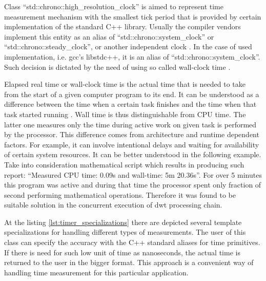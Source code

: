 Class ``std::chrono::high\_resolution\_clock'' is aimed to represent time measurement mechanism with the
smallest tick period that is provided by certain implementation of the standard C++ library. Usually
the compiler vendors implement this entity as an alias of ``std::chrono::system\_clock'' or
``std::chrono::steady\_clock'', or another independent clock \cite{cppreference}. In the case of used implementation,
i.e. gcc's libstdc++, it is an alias of ``std::chrono::system\_clock''. Such decision is dictated by
the need of using so called wall-clock time \cite{cppreference}.

Elapsed real time or wall-clock time is the actual time that is needed to take from the start of a given
computer program to its end. It can be understood as a difference between the time when a certain task 
finishes and the time when that task started running \cite{wall_clock}. Wall time is thus distinguishable
from CPU time. The latter one measures only the time during active work on given task is performed by the
processor. This difference comes from architecture and runtime dependent factors. For example, it can involve
intentional delays and waiting for availability of certain system resources. It can be better understood
in the following example. Take into consideration mathematical script which results in producing such report:
``Measured CPU time: 0.09s and wall-time: 5m 20.36s''. For over 5 minutes this program was active and during
that time the processor spent only fraction of second performing mathematical operations. Therefore it was
found to be suitable solution in the concurrent execution of dwt processing chain.

At the listing \ref{lst:timer_specializations} there are depicted several template specializations for
handling different types of measurements. The user of this class can specify the accuracy with the C++ standard
aliases for time primitives. If there is need for such low unit of time as nanoseconds, the actual time
is returned to the user in the bigger format. This approach is a convenient way of handling time measurement
for this particular application.

